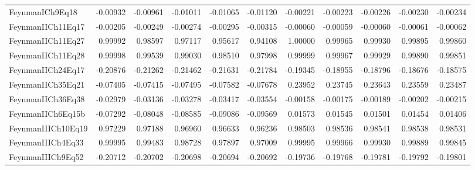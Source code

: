 \begin{tabular}{lrrrrrrrrrr}
FeynmanICh9Eq18 & -0.00932 & -0.00961 & -0.01011 & -0.01065 & -0.01120 & -0.00221 & -0.00223 & -0.00226 & -0.00230 & -0.00234 \\
FeynmanIICh11Eq17 & -0.00205 & -0.00249 & -0.00274 & -0.00295 & -0.00315 & -0.00060 & -0.00059 & -0.00060 & -0.00061 & -0.00062 \\
FeynmanIICh11Eq27 & 0.99992 & 0.98597 & 0.97117 & 0.95617 & 0.94108 & 1.00000 & 0.99965 & 0.99930 & 0.99895 & 0.99860 \\
FeynmanIICh11Eq28 & 0.99998 & 0.99539 & 0.99030 & 0.98510 & 0.97998 & 0.99999 & 0.99967 & 0.99929 & 0.99890 & 0.99851 \\
FeynmanIICh24Eq17 & -0.20876 & -0.21262 & -0.21462 & -0.21631 & -0.21784 & -0.19345 & -0.18955 & -0.18796 & -0.18676 & -0.18575 \\
FeynmanIICh35Eq21 & -0.07405 & -0.07415 & -0.07495 & -0.07582 & -0.07678 & 0.23952 & 0.23745 & 0.23643 & 0.23559 & 0.23487 \\
FeynmanIICh36Eq38 & -0.02979 & -0.03136 & -0.03278 & -0.03417 & -0.03554 & -0.00158 & -0.00175 & -0.00189 & -0.00202 & -0.00215 \\
FeynmanIICh6Eq15b & -0.07292 & -0.08048 & -0.08585 & -0.09086 & -0.09569 & 0.01573 & 0.01545 & 0.01501 & 0.01454 & 0.01406 \\
FeynmanIIICh10Eq19 & 0.97229 & 0.97188 & 0.96960 & 0.96633 & 0.96236 & 0.98503 & 0.98536 & 0.98541 & 0.98538 & 0.98531 \\
FeynmanIIICh4Eq33 & 0.99995 & 0.99483 & 0.98728 & 0.97897 & 0.97009 & 0.99995 & 0.99966 & 0.99930 & 0.99889 & 0.99845 \\
FeynmanIIICh9Eq52 & -0.20712 & -0.20702 & -0.20698 & -0.20694 & -0.20692 & -0.19736 & -0.19768 & -0.19781 & -0.19792 & -0.19801 \\
\bottomrule
\end{tabular}
